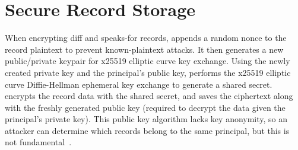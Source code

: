 %
\iffalse
\begin{figure}[t]
\begin{lstlisting}[style=rust,escapeinside={(*}{*)}]
// Generates keypair for p and returns
// the user's backup credential
(*\textbf{RegisterPrincipal}*)(p: UID, pw: Password,
        pubkey: PublicKey, privkey: PrivKey)
    -> Credential;
// \xxs principal p according to the spec,
// optionally over already-\xxed data ((*\S\ref{s:composition}*))
(*\textbf{\xxData}*)(p: Option<UID>, spec: \xxSpec,
    \xx_over: Option<(
        Credential,
        Vec<Locator>
    )>) -> (\xxID, Vec<Locator>);
// Reveals data \xxed by s for p with p's
// private key.
// locs point to bags p can decrypt
(*\textbf{RevealData}*)(p: Option<UID>, s: \xxID,
    cred: Credential, locs: Vec<Locator>);
// Gets principals at loc that p can speak-for.
(*\textbf{CanSpeakFor}*)(p: UID, cred: Credential,
    loc: Locator) -> Vec<UID>;
\end{lstlisting}
\caption{\sys's high-level API (Rust-like syntax).}
\label{f:api-high}
\end{figure}
%
\fi


\section{Secure Record Storage}
%
When encrypting diff and speaks-for records, \sys appends a random nonce to
the record plaintext to prevent known-plaintext attacks.
%
It then generates a new public/private keypair for x25519 elliptic curve key
exchange.
%
Using the newly created private key and the principal's public key, \sys
performs the x25519 elliptic curve Diffie-Hellman ephemeral key exchange to
generate a shared secret.
%
\sys encrypts the record data with the shared secret, and saves the
ciphertext along with the freshly generated public key (required to decrypt
the data given the principal's private key).
%
This public key algorithm lacks key anonymity, so an attacker can determine
which records belong to the same principal, but this is not
fundamental~\cite{anonymous-keys}.

